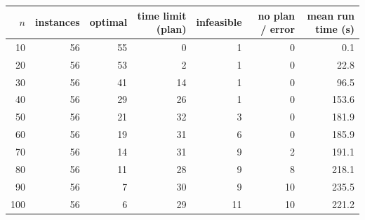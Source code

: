 \begin{tabular}{@{}rrrrrrr@{}}
\toprule
$n$ & instances & optimal & time limit (plan) & infeasible & no plan / error & mean run time (s) \\
\midrule
10 & 56 & 55 & 0 & 1 & 0 & 0.1 \\
20 & 56 & 53 & 2 & 1 & 0 & 22.8 \\
30 & 56 & 41 & 14 & 1 & 0 & 96.5 \\
40 & 56 & 29 & 26 & 1 & 0 & 153.6 \\
50 & 56 & 21 & 32 & 3 & 0 & 181.9 \\
60 & 56 & 19 & 31 & 6 & 0 & 185.9 \\
70 & 56 & 14 & 31 & 9 & 2 & 191.1 \\
80 & 56 & 11 & 28 & 9 & 8 & 218.1 \\
90 & 56 & 7 & 30 & 9 & 10 & 235.5 \\
100 & 56 & 6 & 29 & 11 & 10 & 221.2 \\
\bottomrule
\end{tabular}

